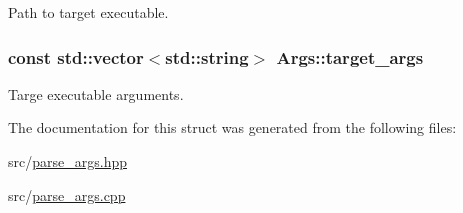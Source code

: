 Path to target executable. 

\hypertarget{struct_args_aa9f8e387df0b3691352daf352876176d}{
\subsubsection[{target\-\_\-args}]{\setlength{\rightskip}{0pt plus 5cm}const std\-::vector$<$std\-::string$>$ Args\-::target\-\_\-args}}\label{struct_args_aa9f8e387df0b3691352daf352876176d}


Targe executable arguments. 



The documentation for this struct was generated from the following files\-:\begin{DoxyCompactItemize}
\item 
src/\hyperlink{parse__args_8hpp}{parse\-\_\-args.\-hpp}\item 
src/\hyperlink{parse__args_8cpp}{parse\-\_\-args.\-cpp}\end{DoxyCompactItemize}
